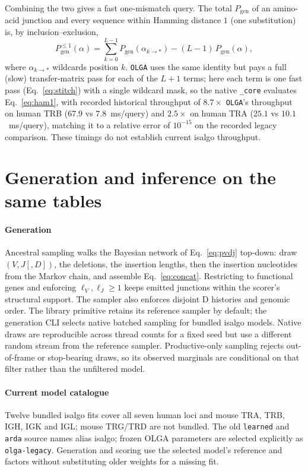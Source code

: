 \documentclass[11pt]{article}
\theoremstyle{oldplain}
\theoremstyle{oldrem}
\newcommand{\Pgen}{P_{\mathrm{gen}}}
\begin{document}
Combining the two gives a fast one-mismatch query. The total $\Pgen$ of an amino-acid junction and every
sequence within Hamming distance $1$ (one substitution) is, by inclusion--exclusion,
\begin{equation}\label{eq:ham1}
  \Pgen^{\le 1}(\alpha)=\sum_{k=0}^{L-1}\Pgen(\alpha_{k\to *})-(L-1)\,\Pgen(\alpha),
\end{equation}
where $\alpha_{k\to *}$ wildcards position $k$. \texttt{OLGA} uses the same identity but pays a full
(slow) transfer-matrix pass for each of the $L{+}1$ terms; here each term is one fast pass
(Eq.~\eqref{eq:stitch}) with a single wildcard mask, so the native \texttt{\_core} evaluates
Eq.~\eqref{eq:ham1}, with recorded historical throughput of $8.7\times$ \texttt{OLGA}'s throughput on human TRB ($67.9$ vs $7.8$~ms/query)
and $2.5\times$ on human TRA ($25.1$ vs $10.1$~ms/query), matching it to a relative error of
$10^{-15}$ on the recorded legacy comparison. These timings do not establish current
isalgo throughput.

\section{Generation and inference on the same tables}\label{sec:em}

\paragraph{Generation} Ancestral sampling walks the Bayesian network of Eq.~\eqref{eq:pvdj} top-down:
draw $(V,J[,D])$, the deletions, the insertion lengths, then the insertion nucleotides from the Markov
chain, and assemble Eq.~\eqref{eq:concat}. Restricting to functional genes and enforcing $\ell_V,\ell_J\ge1$
keeps emitted junctions within the scorer's structural support.
The sampler also enforces disjoint D histories and genomic order.
The library primitive retains its reference sampler by default; the generation CLI
selects native batched sampling for bundled isalgo models.
Native draws are reproducible across thread counts for a fixed seed but use a
different random stream from the reference sampler.
Productive-only sampling rejects out-of-frame or stop-bearing draws, so its
observed marginals are conditional on that filter rather than the unfiltered model.

\paragraph{Current model catalogue} Twelve bundled isalgo fits cover all seven human
loci and mouse TRA, TRB, IGH, IGK and IGL; mouse TRG/TRD are not bundled.
The old \texttt{learned} and \texttt{arda} source names alias isalgo; frozen
OLGA parameters are selected explicitly as \texttt{olga-legacy}.
Generation and scoring use the selected model's reference and factors without
substituting older weights for a missing fit.
\end{document}
